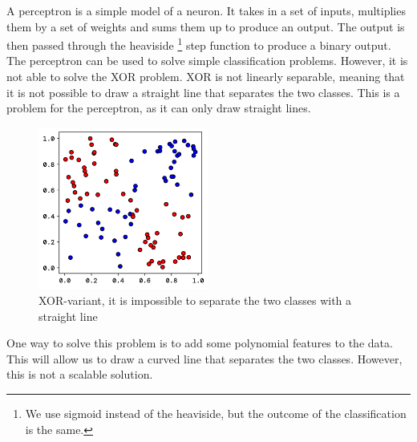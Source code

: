 \documentclass[twoside,11pt]{report}
\begin{document}
A perceptron is a simple model of a neuron. It takes in a set of inputs, multiplies them by a set of weights 
and sums them up to produce an output. The output is then passed through the heaviside
\footnote{We use sigmoid instead of the heaviside, but the outcome of the classification is the same.}
step function to produce
a binary output. The perceptron can be used to solve simple classification problems. However, it is not able to
solve the XOR problem. XOR is not linearly separable, meaning that it is not possible to draw a straight line
that separates the two classes. This is a problem for the perceptron, as it can only draw straight lines.

\begin{figure}[h]
    \begin{center}
        \includegraphics[width=0.5\textwidth]{../runsAndFigures/xor.png}
    \end{center}
    \caption{XOR-variant, it is impossible to separate the two classes with a straight line}\label{fig:xor_data}
\end{figure}


One way to solve this problem is to add some polynomial features to the data. 
This will allow us to draw a curved line that separates the two classes. However, this is not a scalable solution.
\end{document}
